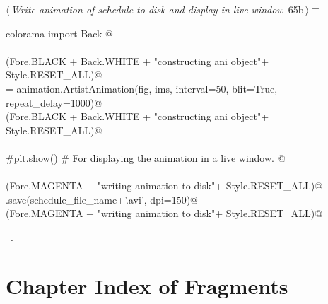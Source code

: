 \documentclass[11.5pt]{report}
\begin{document}
\vspace{-0.8cm} \newchunk


\begin{flushleft} \small\label{scrap98}\raggedright\small
{} $\langle\,${\itshape Write animation of schedule to disk and display in live window}\nobreak\ {\footnotesize {65b}}$\,\rangle\equiv$
\vspace{-1ex}
\begin{list}{}{} \item
\mbox{}\verb@from colorama import Back @\\
\mbox{}\verb@@\\
\mbox{}\verb@debug(Fore.BLACK + Back.WHITE + "\nStarted constructing ani object"+ Style.RESET_ALL)@\\
\mbox{}\verb@ani = animation.ArtistAnimation(fig, ims, interval=50, blit=True, repeat_delay=1000)@\\
\mbox{}\verb@debug(Fore.BLACK + Back.WHITE + "\nFinished constructing ani object"+ Style.RESET_ALL)@\\
\mbox{}\verb@@\\
\mbox{}\verb@#plt.show() # For displaying the animation in a live window. @\\
\mbox{}\verb@@\\
\mbox{}\verb@debug(Fore.MAGENTA + "\nStarted writing animation to disk"+ Style.RESET_ALL)@\\
\mbox{}\verb@ani.save(schedule_file_name+'.avi', dpi=150)@\\
\mbox{}\verb@debug(Fore.MAGENTA + "\nFinished writing animation to disk"+ Style.RESET_ALL)@\\
\mbox{}\verb@@{\NWsep}
\end{list}
\vspace{-1.5ex}
\footnotesize
\begin{list}{}{\setlength{\itemsep}{-\parsep}\setlength{\itemindent}{-\leftmargin}}
\item \NWtxtMacroRefIn\ .

\item{}
\end{list}
\vspace{4ex}
\end{flushleft}

\section{Chapter Index of Fragments}
\end{document}
